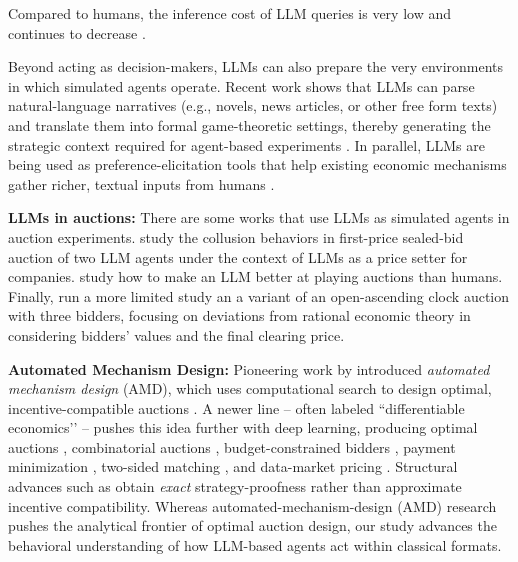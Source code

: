 \documentclass{article} %
\newcommand{\kibitz}[2]{\ifnum\Comments=1{\color{#1}{#2}}\fi}
\newcommand{\dcpadd}[1]{\kibitz{english}{#1}}
\begin{document}
Compared to humans, the inference cost of LLM queries is very low and continues to decrease \citep{achiam2023gpt,patel2023splitwise,bae2023complexitynet}.

Beyond acting as decision-makers, LLMs can also prepare the very environments in which simulated agents operate.
Recent work shows that LLMs can parse natural-language narratives (e.g., novels, news articles, or other free form texts) and translate them into formal game-theoretic settings, thereby generating the strategic context required for agent-based experiments \citep{daskalakis2024charting, mensfelt2024autoformalization, deng2025natural}.
In parallel, LLMs are being used as preference-elicitation tools that help existing economic mechanisms gather richer, textual inputs from humans \citep{soumalias2025llm, huang2025accelerated}.


\textbf{LLMs in auctions:}
There are some works that use LLMs as simulated agents in auction experiments.
\citet{fish2024algorithmic} study the collusion behaviors in first-price sealed-bid auction of two LLM agents
 under the context of LLMs as a price setter for companies. 
\citet{chen2023put} study how to make an LLM better at playing auctions than humans.
Finally, \citet{manning2024automated} run a more limited study an a variant of an open-ascending clock auction with three bidders, focusing on deviations from rational economic theory in considering bidders' values and the final clearing price.

\textbf{Automated Mechanism Design:} Pioneering work by \citet{conitzer2002complexity, conitzer2004self} introduced \emph{automated mechanism design} (AMD), which uses computational search to design optimal, incentive-compatible auctions \citep{curry102automated}.
A newer line -- often labeled “differentiable economics’’ \citep{dutting2024optimal} -- pushes this idea further with deep learning, producing optimal auctions \citep{dutting2024optimal}, combinatorial auctions \citep{wang2025bundleflow}, budget-constrained bidders \citep{feng2018deep}, payment minimization \citep{tacchetti2019neural}, two-sided matching \citep{ravindranath2021deep}, and data-market pricing \citep{ravindranathdata}.
Structural advances such as \citet{wang2024gemnet} obtain \emph{exact} strategy-proofness rather than approximate incentive compatibility. Whereas automated-mechanism-design (AMD) research pushes the analytical frontier of optimal auction design, our study advances the behavioral understanding of how LLM-based agents act within classical formats. 
\end{document}

